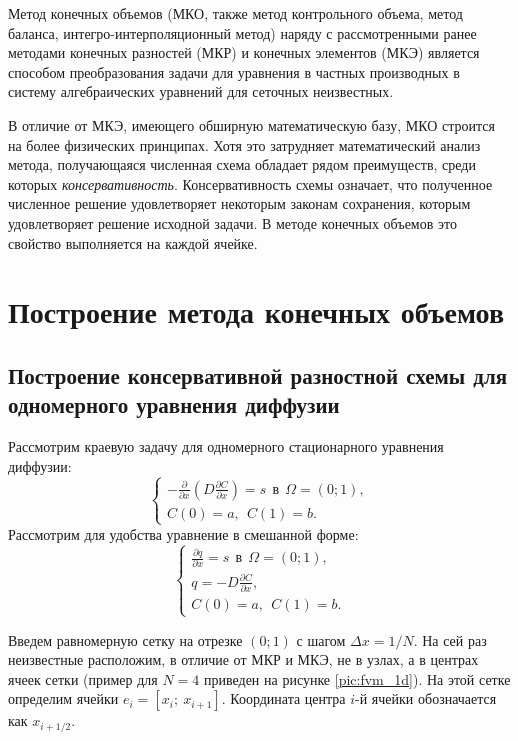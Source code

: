 \documentclass[a4paper, 11pt]{article}
\begin{document}
Метод конечных объемов (МКО, также метод контрольного объема, метод баланса, интегро-интерполяционный метод) наряду с рассмотренными ранее методами конечных разностей (МКР) и конечных элементов (МКЭ) является способом преобразования задачи для уравнения в частных производных в систему алгебраических уравнений для сеточных неизвестных. 

В отличие от МКЭ, имеющего обширную математическую базу, МКО строится на более физических принципах. Хотя это затрудняет математический анализ метода, получающаяся численная схема обладает рядом преимуществ, среди которых \textit{консервативность}. Консервативность схемы означает, что полученное численное решение удовлетворяет некоторым законам сохранения, которым удовлетворяет решение исходной задачи. В методе конечных объемов это свойство выполняется на каждой ячейке.

\section{Построение метода конечных объемов}
\subsection{Построение консервативной разностной схемы для одномерного уравнения диффузии}
Рассмотрим краевую задачу для одномерного стационарного уравнения диффузии:
\begin{equation}
\begin{cases}
-\frac{\partial}{\partial x} \left(D\frac{\partial C}{\partial x}\right) = s~~\text{в}~~\Omega=\left(0;1\right),\\
C\left(0\right) = a,~~C\left(1\right)=b.
\end{cases}
\end{equation}
Рассмотрим для удобства уравнение в смешанной форме:
\begin{equation}\label{eq:diff_1d_mixed}
\begin{cases}
\frac{\partial q}{\partial x} = s~~\text{в}~~\Omega=\left(0;1\right),\\
q = -D\frac{\partial C}{\partial x},\\
C\left(0\right) = a,~~C\left(1\right)=b.
\end{cases}
\end{equation}

Введем равномерную сетку на отрезке $(0;1)$ с шагом $\Delta x = 1/N$. На сей раз неизвестные расположим, в отличие от МКР и МКЭ, не в узлах, а в центрах ячеек сетки (пример для $N = 4$ приведен на рисунке \ref{pic:fvm_1d}). На этой сетке определим ячейки $e_i=\left[x_i;~x_{i+1}\right]$. Координата центра $i$-й ячейки обозначается как $x_{i+1/2}$.
\end{document}
